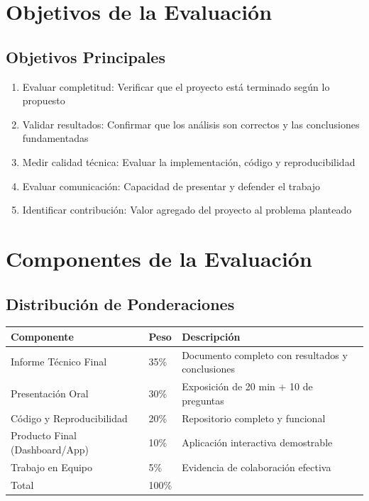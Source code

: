 \documentclass[11pt,a4paper]{article}
\begin{document}
\section{Objetivos de la Evaluación}
\subsection{Objetivos Principales}
\begin{enumerate}[leftmargin=*]
\item Evaluar completitud: Verificar que el proyecto está terminado según lo propuesto
\item Validar resultados: Confirmar que los análisis son correctos y las conclusiones fundamentadas
\item Medir calidad técnica: Evaluar la implementación, código y reproducibilidad
\item Evaluar comunicación: Capacidad de presentar y defender el trabajo
\item Identificar contribución: Valor agregado del proyecto al problema planteado
\end{enumerate}

\section{Componentes de la Evaluación}
\subsection{Distribución de Ponderaciones}
\begin{center}
\begin{tabular}{p{} p{} p{}}
\toprule
\textbf{Componente} & \textbf{Peso} & \textbf{Descripción}\\
\midrule
Informe Técnico Final & 35\% & Documento completo con resultados y conclusiones\\
Presentación Oral & 30\% & Exposición de 20 min + 10 de preguntas\\
Código y Reproducibilidad & 20\% & Repositorio completo y funcional\\
Producto Final (Dashboard/App) & 10\% & Aplicación interactiva demostrable\\
Trabajo en Equipo & 5\% & Evidencia de colaboración efectiva\\
\midrule
Total & 100\% & \\
\bottomrule
\end{tabular}
\end{center}
\end{document}
